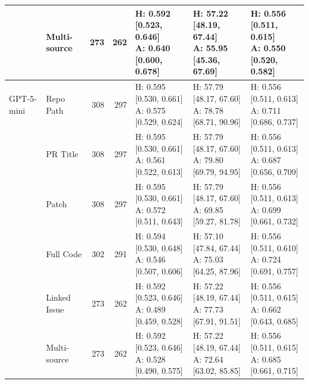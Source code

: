 \begin{table}[tp]
\begin{tabular}{llrrlll}
 & Multi-source & 273 & 262 & \shortstack[l]{H: 0.592 [0.523, 0.646]\\A: 0.640 [0.600, 0.678]} & \shortstack[l]{H: 57.22 [48.19, 67.44]\\A: 55.95 [45.36, 67.69]} & \shortstack[l]{H: 0.556 [0.511, 0.615]\\A: 0.550 [0.520, 0.582]} \\
\midrule
GPT-5-mini & Repo Path & 308 & 297 & \shortstack[l]{H: 0.595 [0.530, 0.661]\\A: 0.575 [0.529, 0.624]} & \shortstack[l]{H: 57.79 [48.17, 67.60]\\A: 78.78 [68.71, 90.96]} & \shortstack[l]{H: 0.556 [0.511, 0.613]\\A: 0.711 [0.686, 0.737]} \\
 & PR Title & 308 & 297 & \shortstack[l]{H: 0.595 [0.530, 0.661]\\A: 0.561 [0.522, 0.613]} & \shortstack[l]{H: 57.79 [48.17, 67.60]\\A: 79.80 [69.79, 94.95]} & \shortstack[l]{H: 0.556 [0.511, 0.613]\\A: 0.687 [0.656, 0.709]} \\
 & Patch & 308 & 297 & \shortstack[l]{H: 0.595 [0.530, 0.661]\\A: 0.572 [0.511, 0.643]} & \shortstack[l]{H: 57.79 [48.17, 67.60]\\A: 69.85 [59.27, 81.78]} & \shortstack[l]{H: 0.556 [0.511, 0.613]\\A: 0.699 [0.661, 0.732]} \\
 & Full Code & 302 & 291 & \shortstack[l]{H: 0.594 [0.530, 0.648]\\A: 0.546 [0.507, 0.606]} & \shortstack[l]{H: 57.10 [47.84, 67.44]\\A: 75.03 [64.25, 87.96]} & \shortstack[l]{H: 0.556 [0.511, 0.610]\\A: 0.724 [0.691, 0.757]} \\
 & Linked Issue & 273 & 262 & \shortstack[l]{H: 0.592 [0.523, 0.646]\\A: 0.489 [0.459, 0.528]} & \shortstack[l]{H: 57.22 [48.19, 67.44]\\A: 77.73 [67.91, 91.51]} & \shortstack[l]{H: 0.556 [0.511, 0.615]\\A: 0.662 [0.643, 0.685]} \\
 & Multi-source & 273 & 262 & \shortstack[l]{H: 0.592 [0.523, 0.646]\\A: 0.528 [0.490, 0.575]} & \shortstack[l]{H: 57.22 [48.19, 67.44]\\A: 72.64 [63.02, 85.85]} & \shortstack[l]{H: 0.556 [0.511, 0.615]\\A: 0.685 [0.661, 0.715]} \\

\end{tabular}
\end{table}
